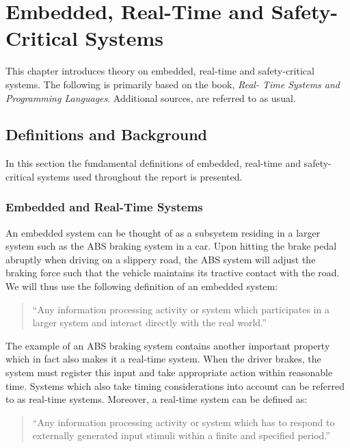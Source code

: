 \chapter{Embedded, Real-Time and Safety-Critical Systems}
\label{chapter:rts}
This chapter introduces theory on embedded, real-time and safety-critical systems. The following is primarily based on the book, \textit{Real- Time Systems and Programming Languages}\cite{alan2001real}. Additional sources, are referred to as usual.

\section{Definitions and Background} %
\label{sec:definitions_and_background}
In this section the fundamental definitions of embedded, real-time and safety-critical systems used throughout the report is presented.

\subsection{Embedded and Real-Time Systems} %
\label{sub:real_time_and_embedded_systems}
An embedded system can be thought of as a subsystem residing in a larger system such as the ABS braking system in a car. Upon hitting the brake pedal abruptly when driving on a slippery road, the ABS system will adjust the braking force such that the vehicle maintains its tractive contact with the road. We will thus use the following definition of an embedded system:

\begin{quotation}
``Any information processing activity or system which participates in a larger system and interact directly with the real world.''~\cite{alan2001real}
\end{quotation}

The example of an ABS braking system contains another important property which in fact also makes it a real-time system. When the driver brakes, the system must register this input and take appropriate action within reasonable time. Systems which also take timing considerations into account can be referred to as real-time systems. Moreover, a real-time system can be defined as:

\begin{quotation}
``Any information processing activity or system which has to respond to externally generated input stimuli within a finite and specified period.''~\cite{alan2001real}
\end{quotation}


